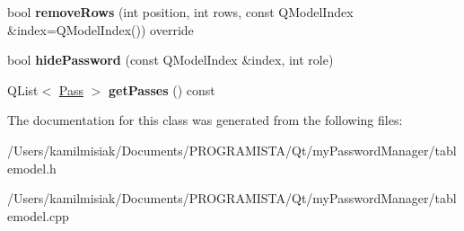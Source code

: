 \begin{DoxyCompactItemize}
bool {\bfseries remove\+Rows} (int position, int rows, const Q\+Model\+Index \&index=Q\+Model\+Index()) override
\item 
\mbox{\label{class_table_model_a46dd43c289737b9beed5f40816f72d21}} 
bool {\bfseries hide\+Password} (const Q\+Model\+Index \&index, int role)
\item 
\mbox{\label{class_table_model_a8ed9e99bad07e7915badbc3889a9bad6}} 
Q\+List$<$ \mbox{\hyperlink{struct_pass}{Pass}} $>$ {\bfseries get\+Passes} () const
\end{DoxyCompactItemize}


The documentation for this class was generated from the following files\+:\begin{DoxyCompactItemize}
\item 
/\+Users/kamilmisiak/\+Documents/\+P\+R\+O\+G\+R\+A\+M\+I\+S\+T\+A/\+Qt/my\+Password\+Manager/tablemodel.\+h\item 
/\+Users/kamilmisiak/\+Documents/\+P\+R\+O\+G\+R\+A\+M\+I\+S\+T\+A/\+Qt/my\+Password\+Manager/tablemodel.\+cpp\end{DoxyCompactItemize}
